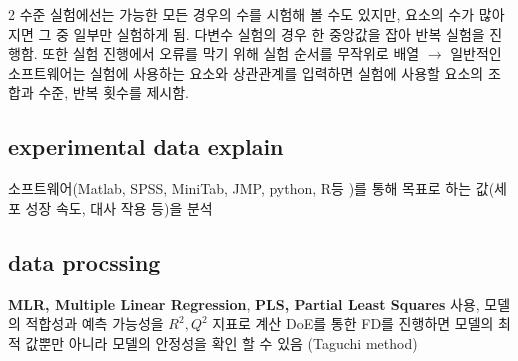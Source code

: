 \documentclass{article}
\begin{document}
2 수준 실험에선는 가능한 모든 경우의 수를 시험해 볼 수도 있지만, 요소의 수가 많아지면 그 중 일부만 실험하게 됨. 다변수 실험의 경우 한 중앙값을 잡아 반복 실험을 진행함. 또한 실험 진행에서 오류를 막기 위해 실험 순서를 무작위로 배열 $\rightarrow$ 일반적인 소프트웨어는 실험에 사용하는 요소와 상관관계를 입력하면 실험에 사용할 요소의 조합과 수준, 반복 횟수를 제시함.
\subsection{experimental data explain}
소프트웨어(Matlab, SPSS, MiniTab, JMP, python, R등 )를 통해 목표로 하는 값(세포 성장 속도, 대사 작용 등)을 분석
\subsection{data procssing}
\textbf{MLR, Multiple Linear Regression}, \textbf{PLS, Partial Least Squares} 사용,
모델의 적합성과 예측 가능성을 $R^2,Q^2$ 지표로 계산 DoE를 통한 FD를 진행하면 모델의 최적 값뿐만 아니라 모델의 안정성을 확인 할 수 있음 (Taguchi method)
\end{document}
